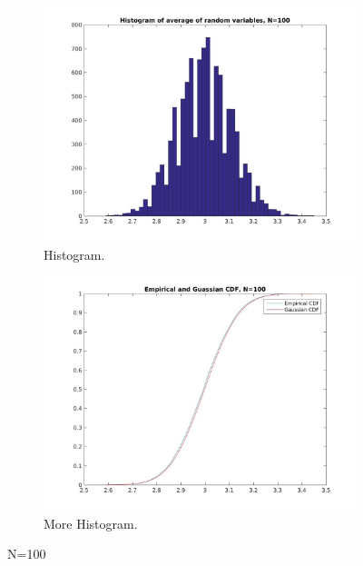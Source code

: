 \documentclass[12pt]{article}
\begin{document}
\begin{figure}[h!]
  \centering
  \begin{subfigure}[b]{0.4\linewidth}
    \includegraphics[width=\linewidth]{jpgs/histograms/100_hist.jpg}
    \caption{Histogram.}
  \end{subfigure}
  \begin{subfigure}[b]{0.4\linewidth}
    \includegraphics[width=\linewidth]{jpgs/cdfs/100_cdf.jpg}
    \caption{More Histogram.}
  \end{subfigure}
  \caption{N=100}
\end{figure}
\end{document}
